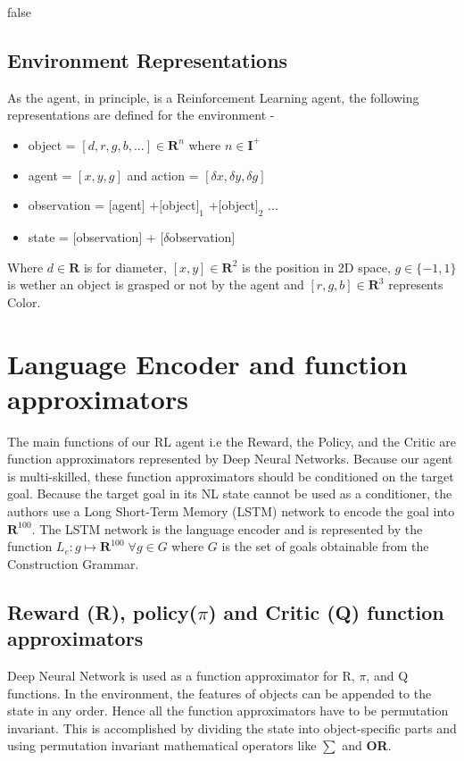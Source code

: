\ifx false
\subsection{Environment Representations}
\label{EnvironmentRepresentationSection}
As the agent, in principle, is a Reinforcement Learning agent,  the following representations are defined for the environment - 
\begin{itemize}
\item object = $[d, r, g, b, ...] \in \mathbf{R}^n$ where $n \in \mathbf{I}^+$
\item agent = $[x, y, g]$ and action = $[\delta x, \delta y, \delta g]$
\item observation = $[$agent$]$ +$[$object$]_1$ +$[$object$]_2$ ...
\item state = $[$observation$]$ + $[\delta$observation$]$
\end{itemize}
Where $d \in \mathbf{R}$ is for diameter, $[x, y] \in \mathbf{R}^2$ is the position in 2D space,
$g \in \{-1, 1\}$ is wether an object is grasped or not by the agent and
$[r, g, b] \in \mathbf{R}^3$ represents Color.
\fi

\section{Language Encoder and function approximators}
The main functions of our RL agent i.e the Reward,  the Policy, and the Critic are function approximators represented by Deep Neural Networks.  Because our agent is multi-skilled, these function approximators should be conditioned on the target goal.  Because the target goal in its NL state cannot be used as a conditioner, the authors use a Long Short-Term Memory (LSTM) network to encode the goal into $\mathbf{R}^{100}$.  The LSTM network is the language encoder and is represented by the function $L_e : g \mapsto \mathbf{R}^{100} \; \forall g \in G$ where $G$ is the set of goals obtainable from the Construction Grammar.

\subsection{Reward (R),  policy($\pi$) and Critic (Q) function approximators}
Deep Neural Network is used as a function approximator for R, $\pi$, and Q functions.  In the environment, the features of objects can be appended to the state in any order. %
Hence all the function approximators have to be permutation invariant.  This is accomplished by dividing the state into object-specific parts and using permutation invariant mathematical operators like $\sum$ and \textbf{OR}\cite{zaheer2018deep}.


